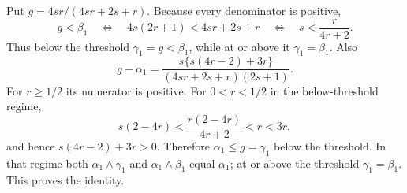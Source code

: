 Put \(g=4sr/(4sr+2s+r)\).  Because every denominator is positive,
\[
g<\beta_1
\quad\Longleftrightarrow\quad
4s(2r+1)<4sr+2s+r
\quad\Longleftrightarrow\quad
s<\frac{r}{4r+2}.
\]
Thus below the threshold \(\gamma_1=g<\beta_1\), while at or above it \(\gamma_1=\beta_1\).  Also
\[
g-\alpha_1
=\frac{s\{s(4r-2)+3r\}}
{(4sr+2s+r)(2s+1)}.
\]
For \(r\geq1/2\) its numerator is positive.  For \(0<r<1/2\) in the below-threshold regime,
\[
s(2-4r)<\frac{r(2-4r)}{4r+2}<r<3r,
\]
and hence \(s(4r-2)+3r>0\).  Therefore \(\alpha_1\leq g=\gamma_1\) below the threshold.  In that regime both \(\alpha_1\wedge\gamma_1\) and \(\alpha_1\wedge\beta_1\) equal \(\alpha_1\); at or above the threshold \(\gamma_1=\beta_1\).  This proves the identity.